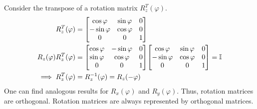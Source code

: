 \documentclass[12pt,a4paper,titlepage]{article}
\begin{document}
Consider the transpose of a rotation matrix $R_{z}^{T}(\varphi)$.
\begin{equation}
\begin{aligned}
R_{z}^{T}(\varphi)&=\mqty[\cos\varphi & \sin\varphi & 0\\ -\sin\varphi & \cos\varphi & 0 \\ 0 & 0 & 1]\\
R_{z}(\varphi)R_{z}^{T}(\varphi)&=\mqty[\cos\varphi & -\sin\varphi & 0\\ \sin\varphi & \cos\varphi & 0 \\ 0 & 0 & 1]\mqty[\cos\varphi & \sin\varphi & 0\\ -\sin\varphi & \cos\varphi & 0 \\ 0 & 0 & 1]=\mathbb{I}\\
\implies R_{z}^{T}(\varphi)&=R_{z}^{-1}(\varphi)=R_{z}(-\varphi)
\end{aligned}
\end{equation}
One can find analogous results for $R_{x}(\varphi)$ and $R_{y}(\varphi)$. Thus, rotation matrices are orthogonal. Rotation matrices are always represented by orthogonal matrices.\\
\end{document}
